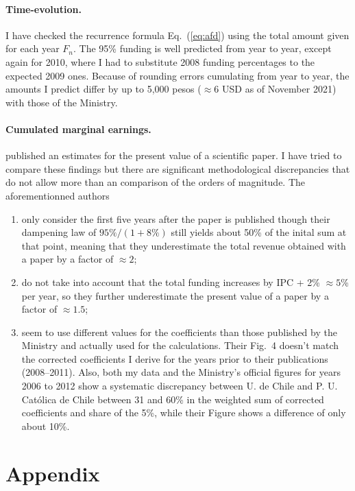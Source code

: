 \documentclass[twocolumn]{article}
\def\eqref#1{Eq.~(\ref{eq:#1})}
\begin{document}
\paragraph{Time-evolution.} I have checked the recurrence formula \eqref{afd} using the total amount given for each year $F_n$.  The 95\% funding is well predicted from year to year, except again for 2010, where I had to substitute 2008 funding percentages to the expected 2009 ones. Because of rounding errors cumulating from year to year, the amounts I predict differ by up to 5,000 pesos ($\approx 6$ USD as of November 2021) with those of the Ministry.

\paragraph{Cumulated marginal earnings.} \citet{RAM12} published an estimates for the present value of a scientific paper. I have tried to compare these findings but there are significant methodological discrepancies that do not allow more than an comparison of the orders of magnitude.  The aforementionned authors
\begin{enumerate}
\item only consider the first five years after the paper is published though their dampening law of $95\% / (1 + 8\%)$ still yields about 50\% of the inital sum at that point, meaning that they underestimate the total revenue obtained with a paper by a factor of $\approx 2$;
\item do not take into account that the total funding increases by IPC + 2\% $\approx 5$\% per year, so they further underestimate the present value of a paper by a factor of $\approx 1.5$;
\item seem to use different values for the coefficients than those published by the Ministry and actually used for the calculations. Their Fig.~4 doesn't match the corrected coefficients I derive for the years prior to their publications (2008--2011). Also, both my data and the Ministry's official figures for years 2006 to 2012 show a systematic discrepancy between U. de Chile and P. U. Católica de Chile between 31 and 60\% in the weighted sum of corrected coefficients and share of the 5\%, while their Figure shows a difference of only about 10\%.
\end{enumerate}



\appendix
\section{Appendix}
\end{document}

